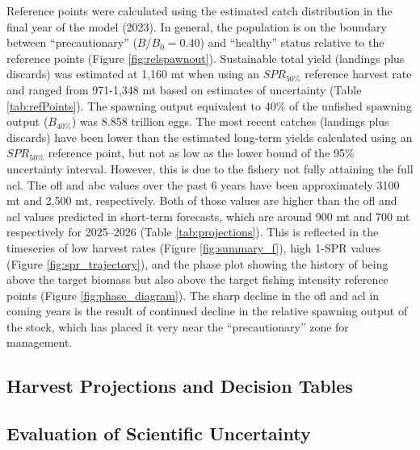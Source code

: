 \documentclass[11pt,
  english,
  letterpaper,
]{article}
\begin{document}
Reference points were calculated using the estimated catch distribution in the final year of the model (2023). In general, the population is on the boundary between ``precautionary'' (\(B/B_0 = 0.40\)) and ``healthy'' status relative to the reference points (Figure \ref{fig:relspawnout}). Sustainable total yield (landings plus discards) was estimated at 1,160 mt when using an \(SPR_{50\%}\) reference harvest rate and ranged from 971-1,348 mt based on estimates of uncertainty (Table \ref{tab:refPoints}). The spawning output equivalent to 40\% of the unfished spawning output (\(B_{40\%}\)) was 8.858 trillion eggs. The most recent catches (landings plus discards) have been lower than the estimated long-term yields calculated using an \(SPR_{50\%}\) reference point, but not as low as the lower bound of the 95\% uncertainty interval. However, this is due to the fishery not fully attaining the full \gls{acl}. The \gls{ofl} and \gls{abc} values over the past 6 years have been approximately 3100 mt and 2,500 mt, respectively. Both of those values are higher than the \gls{ofl} and \gls{acl} values predicted in short-term forecasts, which are around 900 mt and 700 mt respectively for 2025--2026 (Table \ref{tab:projections}). This is reflected in the timeseries of low harvest rates (Figure \ref{fig:summary_f}), high 1-SPR values (Figure \ref{fig:spr_trajectory}), and the phase plot showing the history of being above the target biomass but also above the target fishing intensity reference points (Figure \ref{fig:phase_diagram}). The sharp decline in the \gls{ofl} and \gls{acl} in coming years is the result of continued decline in the relative spawning output of the stock, which has placed it very near the ``precautionary'' zone for management.

\hypertarget{harvest-projections-and-decision-tables}{%
\subsection{Harvest Projections and Decision Tables}\label{harvest-projections-and-decision-tables}}

\hypertarget{evaluation-of-scientific-uncertainty}{%
\subsection{Evaluation of Scientific Uncertainty}\label{evaluation-of-scientific-uncertainty}}
\end{document}
